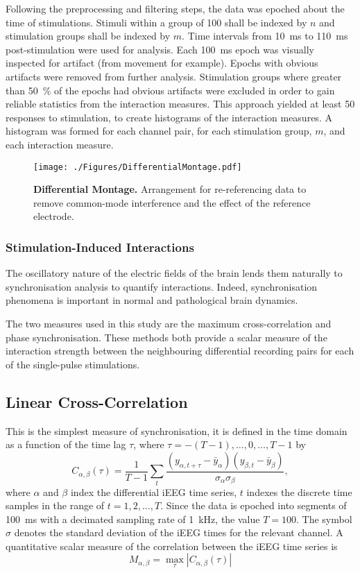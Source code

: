 \documentclass[]{article}
\begin{document}
Following the preprocessing and filtering steps, the data was epoched about the time of stimulations. Stimuli within a group of 100 shall be indexed by $n$ and stimulation groups shall be indexed by $m$. Time intervals from 10~ms to 110~ms post-stimulation were used for analysis. Each 100~ms epoch was visually inspected for artifact (from movement for example). Epochs with obvious artifacts were removed from further analysis. Stimulation groups where greater than 50~\% of the epochs had obvious artifacts were excluded in order to gain reliable statistics from the interaction measures. This approach yielded at least 50 responses to stimulation, to create histograms of the interaction measures. A histogram was formed for each channel pair, for each stimulation group, $m$, and each interaction measure. 

\begin{figure}[htbp]
	\centering
		\texttt{[image: ./Figures/DifferentialMontage.pdf]}
	\caption{\textbf{Differential Montage.} Arrangement for re-referencing data to remove common-mode interference and the effect of the reference electrode.}
	\label{fig:DifMontage}
\end{figure}

\subsubsection{Stimulation-Induced Interactions}

The oscillatory nature of the electric fields of the brain lends them naturally to synchronisation analysis to quantify interactions. Indeed, synchronisation phenomena is important in normal and pathological brain dynamics.

The two measures used in this study are the maximum cross-correlation and phase synchronisation. These methods both provide a scalar measure of the interaction strength between the neighbouring differential recording pairs for each of the single-pulse stimulations. 

\subsection{Linear Cross-Correlation}
This is the simplest measure of synchronisation, it is defined in
the time domain as a function of the time lag $\tau$, where $\tau =
-(T-1),\hdots,0,\hdots,T-1$ by
\begin{equation}
	C_{\alpha,\beta}\left(\tau\right) = \frac{1}{T-1} \sum_t\frac{( y_{\alpha,t+\tau}-\bar{y}_{\alpha}) (y_{\beta,t} - \bar{y}_{\beta})}{\sigma_{\alpha}\sigma_{\beta}},
\end{equation}
where $\alpha$ and $\beta$ index the differential iEEG time series, $t$ indexes the discrete time samples in the range of $t=1,2,\hdots,T$. Since the data is epoched into segments of 100~ms with a decimated sampling rate of 1~kHz, the value $T=100$. The symbol $\sigma$ denotes the standard deviation of the iEEG times for the relevant channel. A quantitative scalar measure of the correlation between the iEEG time series is
\begin{equation}
	M_{\alpha,\beta} = \max_\tau\left|C_{\alpha,\beta}(\tau)\right|
\end{equation}
\end{document}
